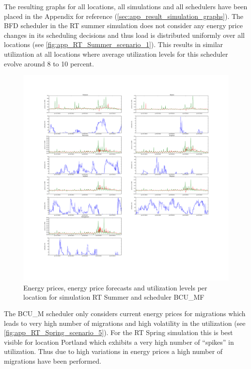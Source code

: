 The resulting graphs for all locations, all simulations and all schedulers have been placed in the Appendix for reference (\ref{sec:app_result_simulation_graphs}). The BFD scheduler in the RT summer simulation does not consider any energy price changes in its scheduling decisions and thus load is distributed uniformly over all locations (see \ref{fig:app_RT_Summer_scenario_1}). This results in similar utilization at all locations where average utilization levels for this scheduler evolve around 8 to 10 percent. 

\begin{figure}[htbp]
	\centering
	\vspace*{-0.6in}
	\hspace*{-1.4in}
		\includegraphics[width=1.60\textwidth]{figures/evaluation_and_results/RT_Summer_scenario_6.pdf}
	\vspace*{-1.0in}
	\caption{Energy prices, energy price forecasts and utilization levels per location for simulation RT Summer and scheduler BCU\_MF}
	\label{fig:RT_Summer_scenario_6}
\end{figure}

The BCU\_M scheduler only considers current energy prices for migrations which leads to very high number of migrations and high volatility in the utilization (see \ref{fig:app_RT_Spring_scenario_5}). For the RT Spring simulation this is best visible for location Portland which exhibits a very high number of ``spikes'' in utilization. Thus due to high variations in energy prices a high number of migrations have been performed. 

